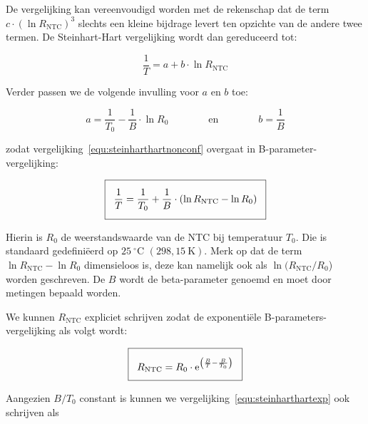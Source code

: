 \documentclass[12pt,a4paper,final,twoside,fleqn]{article}
\newcommand{\rntc}{R_\text{NTC}}
\begin{document}
De vergelijking kan vereenvoudigd worden met de rekenschap dat de term
$c\cdot( \ln \rntc )^3$ slechts een kleine bijdrage levert ten opzichte van
de andere twee termen. De Steinhart-Hart vergelijking wordt dan gereduceerd
tot:

\begin{equation}
\label{equ:steinharthartnonconf}
\dfrac{1}{T} = a + b\cdot\ln \rntc 
\end{equation}

Verder passen we de volgende invulling voor $a$ en $b$ toe:

\begin{equation}
\label{equ:substaandb}
a = \dfrac{1}{T_0} - \dfrac{1}{B}\cdot \ln R_0 \qquad\qquad \text{en} \qquad\qquad
b = \dfrac{1}{B}
\end{equation}


zodat vergelijking~\eqref{equ:steinharthartnonconf} overgaat in B-parameter-vergelijking:

\begin{equation}
\label{equ:steinharthartsimpl}
\setlength\fboxsep{2ex}
\boxed{\dfrac{1}{T} = \dfrac{1}{T_0} + \dfrac{1}{B}\cdot (\ln\rntc - \ln R_0)}
\end{equation}

Hierin is $R_0$ de weerstandswaarde van de NTC bij temperatuur $T_0$. Die is standaard
gedefini\"eerd op $25\:^\circ\text{C}$ $(298,15\: \text{K})$. Merk op dat de term
$\ln\rntc - \ln R_0$ dimensieloos is, deze kan namelijk ook als $\ln(\rntc / R_0$)
worden geschreven. De $B$ wordt de beta-parameter genoemd en  moet door metingen
bepaald worden.

We kunnen $\rntc$ expliciet schrijven zodat de exponenti\"ele B-parameters-vergelijking
als volgt wordt:

\begin{equation}
\label{equ:steinharthartexp}
\setlength\fboxsep{2ex}
\boxed{R_\text{NTC} = R_0\cdot\text{e}^{\left(\frac{B}{T}-\frac{B}{T_0}\right)}}
\end{equation}

Aangezien $B/T_0$ constant is kunnen we vergelijking~\eqref{equ:steinharthartexp}
ook schrijven als
\end{document}
